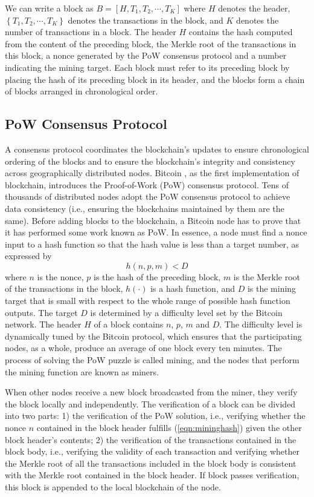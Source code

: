 \documentclass[10pt,journal,compsoc]{IEEEtran}
\begin{document}
We can write a block as $B = \left[ {H,{T_1},{T_2}, \cdots ,{T_K}} \right]$ where $H$ denotes the header, $\left\{ {{T_1},{T_2}, \cdots ,{T_K}} \right\}$ denotes the transactions in the block, and $K$ denotes the number of transactions in a block. The header $H$ contains the hash computed from the content of the preceding block, the Merkle root of the transactions in this block, a nonce generated by the PoW consensus protocol and a number indicating the mining target. Each block must refer to its preceding block by placing the hash of its preceding block in its header, and the blocks form a chain of blocks arranged in chronological order. 

\subsection{PoW Consensus Protocol}
A consensus protocol coordinates the blockchain's updates to ensure chronological ordering of the blocks and to ensure the blockchain's integrity and consistency across geographically distributed nodes. Bitcoin \cite{nakamoto2019bitcoin}, as the first implementation of blockchain, introduces the Proof-of-Work (PoW) consensus protocol. Tens of thousands of distributed nodes adopt the PoW consensus protocol to achieve data consistency (i.e., ensuring the blockchains maintained by them are the same). Before adding blocks to the blockchain, a Bitcoin node has to prove that it has performed some work known as PoW. In essence, a node must find a nonce input to a hash function so that the hash value is less than a target number, as expressed by
\begin{equation}
\label{eqn:mininghash}
h\left( {n,p,m} \right) < D
\end{equation}
where $n$ is the nonce, $p$ is the hash of the preceding block, $m$ is the Merkle root of the transactions in the block, $h\left(  \cdot  \right)$ is a hash function, and $D$ is the mining target that is small with respect to the whole range of possible hash function outputs. The target $D$ is determined by a difficulty level set by the Bitcoin network. The header $H$ of a block contains $n$, $p$, $m$ and $D$. The difficulty level is dynamically tuned by the Bitcoin protocol, which ensures that the participating nodes, as a whole, produce an average of one block every ten minutes. The process of solving the PoW puzzle is called mining, and the nodes that perform the mining function are known as miners.

When other nodes receive a new block broadcasted from the miner, they verify the block locally and independently. The verification of a block can be divided into two parts: 1) the verification of the PoW solution, i.e., verifying whether the nonce $n$ contained in the block header fulfills (\ref{eqn:mininghash}) given the other block header's contents; 2) the verification of the transactions contained in the block body, i.e., verifying the validity of each transaction and verifying whether the Merkle root of all the transactions included in the block body is consistent with the Merkle root contained in the block header. If block passes verification, this block is appended to the local blockchain of the node. 
\end{document}
